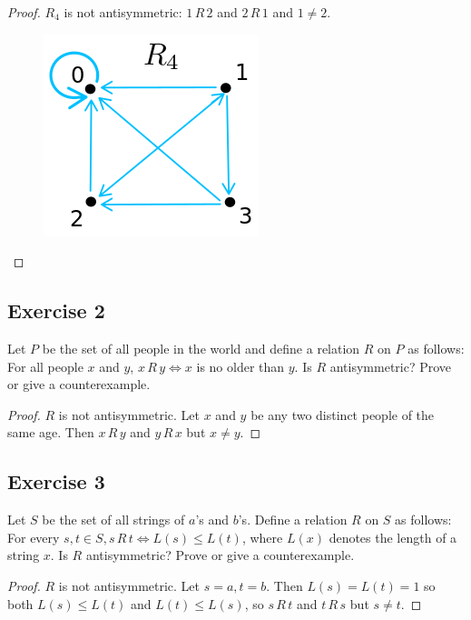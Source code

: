 \documentclass[14pt]{extarticle}
\begin{document}
\begin{proof}
        \(R_4\) is not antisymmetric: \(1 \,R\, 2\) and \(2 \,R\, 1\) and \(1 \neq 2\).
        \begin{figure}[ht!]
                \centering
                \includegraphics[scale=0.5]{../images/8.5.1.d.png}
        \end{figure}
\end{proof}

\subsection{Exercise 2}
Let $P$ be the set of all people in the world and define a relation $R$ on $P$ as follows: For all people $x$ and $y$,
\(x \,R\, y \iff x\) is no older than $y$. Is $R$ antisymmetric? Prove or give a counterexample.

\begin{proof}
        $R$ is not antisymmetric. Let $x$ and $y$ be any two distinct people of the same age. Then \(x \,R\, y\) and
        \(y \,R\, x\) but \(x \neq y\).
\end{proof}

\subsection{Exercise 3}
Let $S$ be the set of all strings of $a$’s and $b$’s. Define a relation $R$ on $S$ as follows: For every \(s, t
\in S, s \,R\, t \iff L(s) \leq L(t)\), where \(L(x)\) denotes the length of a string $x$. Is $R$ antisymmetric?
Prove or give a counterexample.

\begin{proof}
        $R$ is not antisymmetric. Let \(s = a, t = b\). Then \(L(s) = L(t) = 1\) so both \(L(s) \leq L(t)\) and \(L(t) \leq
        L(s)\), so \(s \,R\, t\) and \(t \,R\,s\) but \(s \neq t\).
\end{proof}
\end{document}
